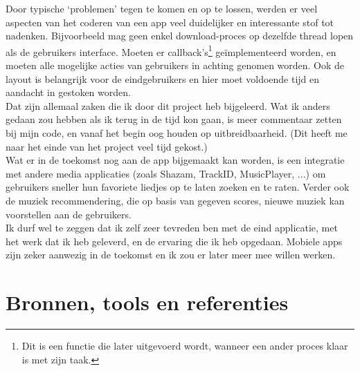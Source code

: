 \documentclass[11pt,a4paper]{article}
\begin{document}
Door typische `problemen' tegen te komen en op te lossen, werden er veel aspecten van het coderen van een app veel duidelijker en interessante stof tot nadenken. Bijvoorbeeld mag geen enkel download-proces op dezelfde thread lopen als de gebruikers interface. Moeten er callback's\footnote{Dit is een functie die later uitgevoerd wordt, wanneer een ander proces klaar is met zijn taak.} geïmplementeerd worden, en moeten alle mogelijke acties van gebruikers in achting genomen worden. Ook de layout is belangrijk voor de eindgebruikers en hier moet voldoende tijd en aandacht in gestoken worden. \\

Dat zijn allemaal zaken die ik door dit project heb bijgeleerd. Wat ik anders gedaan zou hebben als ik terug in de tijd kon gaan, is meer commentaar zetten bij mijn code, en vanaf het begin oog houden op uitbreidbaarheid. (Dit heeft me naar het einde van het project veel tijd gekost.) \\

Wat er in de toekomst nog aan de app bijgemaakt kan worden, is een integratie met andere media applicaties (zoals Shazam, TrackID, MusicPlayer, ...) om gebruikers sneller hun favoriete liedjes op te laten zoeken en te raten. Verder ook de muziek recommendering, die op basis van gegeven scores, nieuwe muziek kan voorstellen aan de gebruikers. \\

Ik durf wel te zeggen dat ik zelf zeer tevreden ben met de eind applicatie, met het werk dat ik heb geleverd, en de ervaring die ik heb opgedaan. Mobiele apps zijn zeker aanwezig in de toekomst en ik zou er later meer mee willen werken.

\newpage	
\section{Bronnen, tools en referenties}
	\label{sec:Bronnen}
\end{document}
